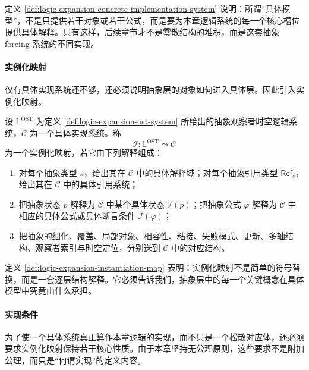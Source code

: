定义 \ref{def:logic-expansion-concrete-implementation-system} 说明：所谓“具体模型”，不是只提供若干对象或若干公式，而是要为本章逻辑系统的每一个核心槽位提供具体解释。只有这样，后续章节才不是零散结构的堆积，而是这套抽象 forcing 系统的不同实现。

\paragraph{实例化映射}
仅有具体实现系统还不够，还必须说明抽象层的对象如何进入具体层。因此引入实例化映射。

\begin{definition}[实例化映射]\label{def:logic-expansion-instantiation-map}
设 \(\mathbb L^{\mathrm{OST}}\) 为定义 \ref{def:logic-expansion-ost-system} 所给出的抽象观察者时空逻辑系统，\(\mathcal C\) 为一个具体实现系统。称
\[
\mathcal I:\mathbb L^{\mathrm{OST}}\leadsto \mathcal C
\]
为一个实例化映射，若它由下列解释组成：
\begin{enumerate}
  \item 对每个抽象类型 \(s\)，给出其在 \(\mathcal C\) 中的具体解释域；对每个抽象引用类型 \(\mathsf{Ref}_s\)，给出其在 \(\mathcal C\) 中的具体引用系统；
  \item 把抽象状态 \(p\) 解释为 \(\mathcal C\) 中某个具体状态 \(\mathcal I(p)\)；把抽象公式 \(\varphi\) 解释为 \(\mathcal C\) 中相应的具体公式或具体断言条件 \(\mathcal I(\varphi)\)；
  \item 把抽象的细化、覆盖、局部对象、相容性、粘接、失败模式、更新、多轴结构、观察者索引与时空定位，分别送到 \(\mathcal C\) 中的对应结构。
\end{enumerate}
\end{definition}

定义 \ref{def:logic-expansion-instantiation-map} 表明：实例化映射不是简单的符号替换，而是一套逐层结构解释。它必须告诉我们，抽象层中的每一个关键概念在具体模型中究竟由什么承担。

\paragraph{实现条件}
为了使一个具体系统真正算作本章逻辑的实现，而不只是一个松散对应体，还必须要求实例化映射保持若干核心性质。由于本章坚持无公理原则，这些要求不是附加公理，而只是“何谓实现”的定义内容。

